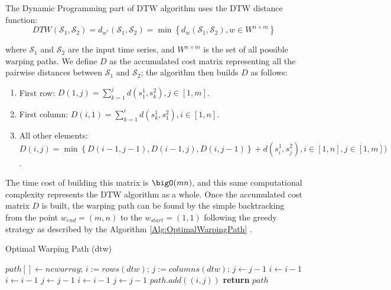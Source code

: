 The Dynamic Programming part of DTW algorithm uses the DTW distance function:
\begin{equation}
DTW(\mathcal{S}_{1}, \mathcal{S}_{2}) =d_{w^{*}}(\mathcal{S}_{1}, \mathcal{S}_{2}) = \min\left\{d_{w}(\mathcal{S}_{1}, \mathcal{S}_{2}), w \in W^{n\times m} \right\}
\end{equation}

where $\mathcal{S}_{1}$ and $\mathcal{S}_{2}$ are the input time series, and $W^{n\times m}$ is the set of all possible warping paths. We define $D$ as the accumulated cost matrix representing all the pairwise distances between $\mathcal{S}_{1}$ and $\mathcal{S}_{2}$; the algorithm then builds $D$ as follows:
\begin{enumerate}
    \item First row: $D(1, j) =\sum_{k=1}^{j}d(s^{1}_{1}, s^{2}_{k}), j \in [1, m]$.
    \item First column: $D(i,1) =\sum_{k=1}^{i}d(s^{1}_{k}, s^{2}_{1}), i \in [1, n]$.
    \item All other elements: $D(i, j) = \min \left\{ D(i-1, j-1), D(i-1, j), D(i, j-1)\right\} + d(s^{1}_{i}, s^{2}_{j}), i \in [1, n], j \in [1, m])$.
\end{enumerate}

The time cost of building this matrix is $\bigO(mn)$, and this same computational complexity represents the DTW algorithm as a whole. Once the accumulated cost matrix $D$ is built, the warping path can be found by the simple backtracking from the point $w_{end} = (m,n)$ to the $w_{start} = (1,1)$ following the greedy strategy as described by the Algorithm \ref{Alg:OptimalWarpingPath} \cite{Senin2008}.

\begin{algorithm}
\caption{Optimal Warping Path (dtw)} 
\label{Alg:OptimalWarpingPath}
\begin{algorithmic}[1]

\State $path[] \gets newarray$;
\State $i:=rows(dtw)$;
\State $j:=columns(dtw)$;
        \State $j \gets j-1$
        \State $i \gets i-1$
    \Else 
            \State $i \gets i-1$
                \State $j \gets j-1$
            \Else
                \State $i \gets i-1$
                \State $j \gets j-1$
        \EndIf
    \State $path.add((i, j))$
    \EndIf
\EndWhile
\State \textbf{return} $path$  
\end{algorithmic}
\end{algorithm}


